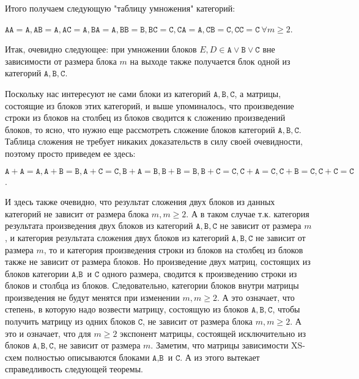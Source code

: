 \documentclass[a4paper,12pt]{report}
\theoremstyle{plain} %
\theoremstyle{definition}
\theoremstyle{remark}
\begin{document}
\begin{large}
Итого получаем следующую "таблицу умножения" категорий:

$\texttt{A}\texttt{A} = \texttt{A}, \texttt{A}\texttt{B} = \texttt{A}, \texttt{A}\texttt{C} = \texttt{A}, \texttt{B}\texttt{A} = \texttt{A}, \texttt{B}\texttt{B} = \texttt{B}, \texttt{B}\texttt{C} = \texttt{C}, \texttt{C}\texttt{A} = \texttt{A}, \texttt{C}\texttt{B} = \texttt{C}, \texttt{C}\texttt{C} = \texttt{C} ~\forall m \geq 2$.

Итак, очевидно следующее: при умножении блоков $E,D \in \texttt{A} \vee \texttt{B} \vee \texttt{C}$ вне зависимости от размера блока $m$ на выходе также получается блок одной из категорий $\texttt{A},\texttt{B},\texttt{C}$.

Поскольку нас интересуют не сами блоки из категорий $\texttt{A},\texttt{B},\texttt{C}$, а матрицы, состоящие из блоков этих категорий, и выше упоминалось, что произведение строки из блоков на столбец из блоков сводится к сложению произведений блоков, то ясно, что нужно еще рассмотреть сложение блоков категорий $\texttt{A},\texttt{B},\texttt{C}$. Таблица сложения не требует никаких доказательств в силу своей очевидности, поэтому просто приведем ее здесь:

$\texttt{A}+\texttt{A} = \texttt{A}, \texttt{A}+\texttt{B} = \texttt{B}, \texttt{A}+\texttt{C} = \texttt{C}, \texttt{B}+\texttt{A} = \texttt{B}, \texttt{B}+\texttt{B} = \texttt{B}, \texttt{B}+\texttt{C} = \texttt{C}, \texttt{C}+\texttt{A} = \texttt{C}, \texttt{C}+\texttt{B} = \texttt{C}, \texttt{C}+\texttt{C} = \texttt{C}$.

И здесь также очевидно, что результат сложения двух блоков из данных категорий не зависит от размера блока $m, m \geq 2$. А в таком случае т.к. категория результата произведения двух блоков из категорий $\texttt{A},\texttt{B},\texttt{C}$ не зависит от размера $m$, и категория результата сложения двух блоков из категорий $\texttt{A},\texttt{B},\texttt{C}$ не зависит от размера $m$, то и категория произведения строки из блоков на столбец из блоков также не зависит от размера блоков. Но произведение двух матриц, состоящих из блоков категории $\texttt{A}, \texttt{B}$ и $\texttt{C}$ одного размера, сводится к произведению строки из блоков и столбца из блоков. Следовательно, категории блоков внутри матрицы произведения не будут менятся при изменении $m, m \geq 2$. А это означает, что степень, в которую надо возвести матрицу, состоящую из блоков $\texttt{A}, \texttt{B},\texttt{C}$, чтобы получить матрицу из одних блоков $\texttt{C}$, не зависит от размера блока $m, m \geq 2$. А это и означает, что для $m \geq 2$ экспонент матрицы, состоящей исключительно из блоков $\texttt{A}, \texttt{B},\texttt{C}$, не зависит от размера $m$. Заметим, что матрицы зависимости XS-схем полностью описываются блоками $\texttt{A}, \texttt{B}$ и $\texttt{C}$. А из этого вытекает справедливость следующей теоремы.


\end{large}
\end{document}

